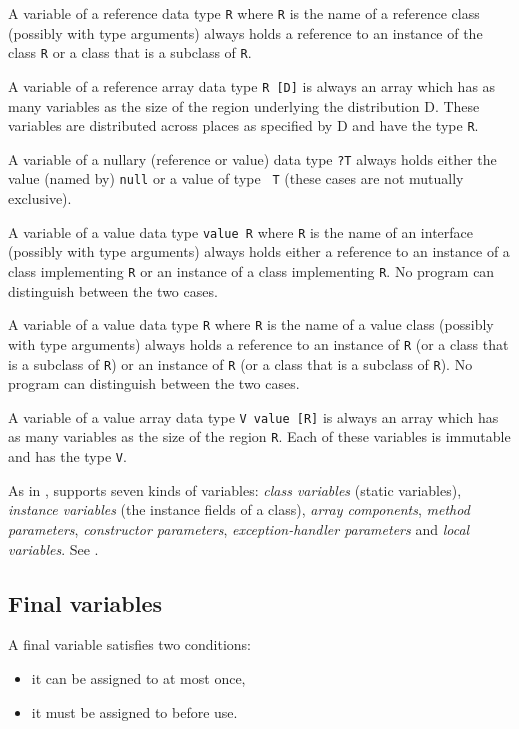 A variable of a reference data type {\tt R} where {\tt R} is the name
of a reference class (possibly with type arguments) always holds a
reference to an instance of the class {\tt R} or a class that is a
subclass of {\tt R}. 

A variable of a reference array data type {\tt R [D]} is always an
array which has as many variables as the size of the region underlying
the distribution {\cf D}. These variables are distributed across
places as specified by {\cf D} and have the type {\tt R}.

A variable of a nullary (reference or value) data type {\tt ?T} always
holds either the value (named by) {\tt null} or a value of type {\tt
T} (these cases are not mutually exclusive).

A variable of a value data type {\tt value R} where {\tt R} is the
name of an interface (possibly with type arguments) always holds
either a reference to an instance of a class implementing {\tt R} or
an instance of a class implementing {\tt R}. No program can
distinguish between the two cases.

A variable of a value data type {\tt R} where {\tt R} is the name of a
value class (possibly with type arguments) always holds a reference to
an instance of {\tt R} (or a class that is a subclass of {\tt R}) or
an instance of {\tt R} (or a class that is a subclass of {\tt R}). No
program can distinguish between the two cases.

A variable of a value array data type {\tt V value [R]} is always an
array which has as many variables as the size of the region {\tt R}.
Each of these variables is immutable and has the type {\tt V}.

As in \java, \Xten{} supports seven kinds of variables: {\em class
variables} (static variables), {\em instance variables} (the instance
fields of a class), {\em array components}, {\em method parameters},
{\em constructor parameters}, {\em exception-handler parameters} and
{\em local variables}. See \cite[\S 4.5.3]{jls2}.

\subsection{Final variables}\label{FinalVariable}
A final variable satisfies two conditions: 
\begin{itemize}
\item it can be assigned to at most once, 
\item it must be assigned to before use. 
\end{itemize}

